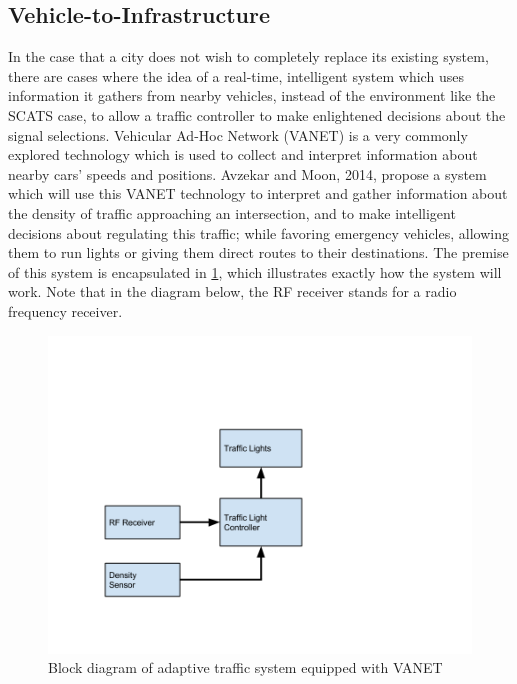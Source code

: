 \subsection{Vehicle-to-Infrastructure}
In the case that a city does not wish to completely replace its existing system, there are cases where the idea of a real-time, intelligent system which uses information it gathers from nearby vehicles, instead of the environment like the SCATS case, to allow a traffic controller to make enlightened decisions about the signal selections.  Vehicular Ad-Hoc Network (VANET) is a very commonly explored technology which is used to collect and interpret information about nearby cars' speeds and positions.  Avzekar and Moon, 2014\cite{V2I}, propose a system which will use this VANET technology to interpret and gather information about the density of traffic approaching an intersection, and to make intelligent decisions about regulating this traffic; while favoring emergency vehicles, allowing them to run lights or giving them direct routes to their destinations.  The premise of this system is encapsulated in \ref{Figure 1}, which illustrates exactly how the system will work.  Note that in the diagram below, the RF receiver stands for a radio frequency receiver.
\begin{figure}[h]
	\centering	
	\includegraphics[scale=.4]{images/vanet.png}
	\caption{Block diagram of adaptive traffic system equipped with VANET}
	\label{Figure 1}
\end{figure}
